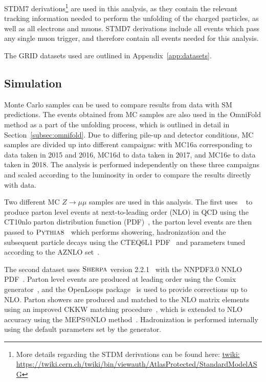 STDM7 derivations\footnote{More details regarding the STDM derivations can be found here: \url{twiki: https://twiki.cern.ch/twiki/bin/viewauth/AtlasProtected/StandardModelASG}} are used in this analysis, as they contain the relevant tracking information needed to perform the unfolding of the charged particles, as well as all electrons and muons. STMD7 derivations include all events which pass any single muon trigger, and therefore contain all events needed for this analysis.

The GRID datasets used are outlined in Appendix~\ref{app:datasets}.

\subsection{Simulation}
Monte Carlo samples can be used to compare results from data with SM predictions. The events obtained from MC samples are also used in the OmniFold method as a part of the unfolding process, which is outlined in detail in Section~\ref{subsec:omnifold}.
Due to differing pile-up and detector conditions, MC samples are divided up into different campaigns: with MC16a corresponding to data taken in 2015 and 2016, MC16d to data taken in 2017, and MC16e to data taken in 2018. The analysis is performed independently
on these three campaigns and scaled according to the luminosity in order to compare the results directly with data.

Two different MC $Z\rightarrow\mu\mu$ samples are used in this analysis. The first uses \powbox{}~\cite{Nason:2004rx,Frixione:2007vw,Alioli:2010xd} to produce parton level events at next-to-leading order (NLO) in QCD using the CT10nlo parton distribution function (PDF)~\cite{Lai:2010vv}, the parton level events are
then passed to $\textsc{Pythia8}$~\cite{Sjostrand:2007gs} which performs showering, hadronization and the subsequent particle decays using the CTEQ6L1 PDF~\cite{Lai:2010vv} and parameters tuned according to the AZNLO set~\cite{Aad:2014xaa}.

The second dataset uses $\textsc{Sherpa}$ version 2.2.1~\cite{Gleisberg:2008ta,Bothmann:2019yzt} with the NNPDF3.0 NNLO PDF~\cite{Ball:2012cx}. Parton level events are produced at leading order using the Comix generator~\cite{Gleisberg:2008fv}, and the OpenLoops package~\cite{Cascioli:2011va} is used to provide corrections up to NLO.
Parton showers are produced and matched to the NLO matrix elements using an improved CKKW matching procedure~\cite{Catani:2001cc,Hoeche:2009rj}, which is extended to NLO accuracy using the MEPS@NLO method~\cite{Hoeche:2012yf}. Hadronization is performed internally using the default parameters set by the generator.

